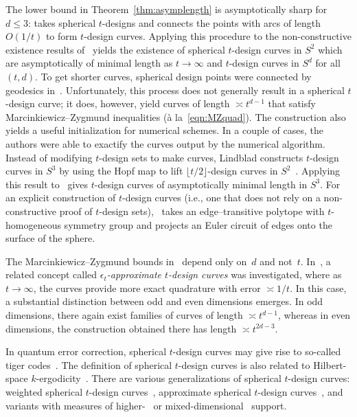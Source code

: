 \documentclass[12pt]{article}
\theoremstyle{plain}
\theoremstyle{definition}
\theoremstyle{remark}
\newcommand{\rar}{\rightarrow}
\begin{document}
The lower bound in Theorem~\ref{thm:asymplength} is asymptotically sharp for $d \leq 3$: 
\cite{EhlerG:23} takes spherical $t$-designs and connects the points with arcs of length $O(1/t)$ to form $t$-design curves.
Applying this procedure to the non-constructive existence results of~\cite{KorevaarM:93,BondarenkoRV:13} yields the existence of spherical $t$-design curves in $S^2$ which are asymptotically of minimal length as $t \rar \infty$ and $t$-design curves in $S^d$ for all $(t,d)$.
To get shorter curves, spherical design points were connected by geodesics in~\cite{EhlerGK:25}.
Unfortunately, this process does not generally result in a spherical $t$-design curve; it does, however, yield curves of length $\asymp t^{d-1}$ that satisfy Marcinkiewicz--Zygmund inequalities (\`a la~\eqref{eqn:MZquad}).
The construction also yields a useful initialization for numerical schemes.
In a couple of cases, the authors were able to exactify the curves output by the numerical algorithm. 
Instead of modifying $t$-design sets to make curves, Lindblad constructs $t$-design curves in $S^3$ by using the Hopf map to lift $\lfloor t/2\rfloor$-design curves in $S^2$~\cite{Lindblad:24}.
Applying this result to~\cite{EhlerG:23} gives $t$-design curves of asymptotically minimal length in $S^3$.
For an explicit construction of $t$-design curves (i.e., one that does not rely on a non-constructive proof of $t$-design sets), \cite{Ehler:25}~takes an edge--transitive polytope with $t$-homogeneous symmetry group and projects an Euler circuit of edges onto the surface of the sphere.

The Marcinkiewicz--Zygmund bounds in~\cite{EhlerGK:25} depend only on~$d$ and not~$t$. 
In~\cite{Lindblad:25}, a related concept called \emph{$\epsilon_t$-approximate $t$-design curves} was investigated, where as $t \rar \infty$, the curves provide more exact quadrature with error $\asymp 1/t$.
In this case, a substantial distinction between odd and even dimensions emerges. 
In odd dimensions, there again exist families of curves of length $\asymp t^{d-1}$, whereas in even dimensions, the construction obtained there has length $\asymp t^{2d-3}$. 




In quantum error correction, spherical $t$-design curves may give rise to so-called tiger codes~\cite{XuWVA:25}.
The definition of spherical $t$-design curves is also related to Hilbert-space $k$-ergodicity~\cite{PilatowskyCameoMCH:24,MarkSESCREC:24}.
There are various generalizations of spherical $t$-design curves: weighted spherical $t$-design curves~\cite{EhlerG:23}, approximate spherical $t$-design curves~\cite{EhlerG:25,Lindblad:25}, and variants with measures of higher-~\cite{EhlerG:25} or mixed-dimensional~\cite{Ehler:25} support.
\end{document}
